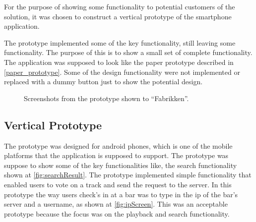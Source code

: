 For the purpose of showing some functionality to potential customers of the solution, it was chosen to construct a vertical prototype of the smartphone application.

The prototype implemented some of the key functionality, still leaving some functionality. The purpose of this is to show a small set of complete functionality. The application was supposed to look like the paper prototype described in \cref{paper_prototype}. Some of the design functionality were not implemented or replaced with a dummy button just to show the potential design.

\begin{figure}[hbtp]
  \centering
  \caption{Screenshots from the prototype shown to \enquote{Fabrikken}.}
\end{figure}

\subsection{Vertical Prototype}
\label{sub:vertical_prototype}

The prototype was designed for android phones, which is one of the mobile platforms that the application is supposed to support. The prototype was suppose to show some of the key functionalities like, the search functionality shown at \cref{fig:searchResult}. The prototype implemented simple functionality that enabled users to vote on a track and send the request to the server. In this prototype the way users check's in at a bar was to type in the ip of the bar's server and a username, as shown at \cref{fig:ipScreen}. This was an acceptable prototype because the focus was on the playback and search functionality.